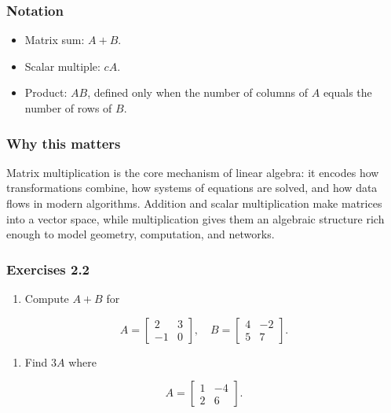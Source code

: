\documentclass[
  12pt,
  a4paper,
]{article}
\begin{document}
\subsubsection{Notation}\label{notation-5}

\begin{itemize}
\item
  Matrix sum: \(A+B\).
\item
  Scalar multiple: \(cA\).
\item
  Product: \(AB\), defined only when the number of columns of \(A\)
  equals the number of rows of \(B\).
\end{itemize}

\subsubsection{Why this matters}\label{why-this-matters-5}

Matrix multiplication is the core mechanism of linear algebra: it
encodes how transformations combine, how systems of equations are
solved, and how data flows in modern algorithms. Addition and scalar
multiplication make matrices into a vector space, while multiplication
gives them an algebraic structure rich enough to model geometry,
computation, and networks.

\subsubsection{Exercises 2.2}\label{exercises-22}

\begin{enumerate}
\def\labelenumi{\arabic{enumi}.}
\item
  Compute \(A+B\) for
\end{enumerate}

\[A = \begin{bmatrix} 2 & 3 \\ -1 & 0 \end{bmatrix}, \quad
B = \begin{bmatrix} 4 & -2 \\ 5 & 7 \end{bmatrix}.\]

\begin{enumerate}
\def\labelenumi{\arabic{enumi}.}
\item
  Find \(3A\) where
\end{enumerate}

\[A = \begin{bmatrix} 1 & -4 \\ 2 & 6 \end{bmatrix}.\]
\end{document}
